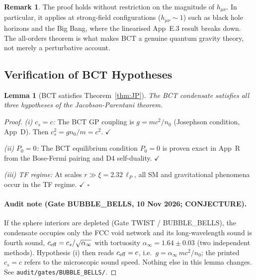 \documentclass[11pt,a4paper]{article}
\theoremstyle{bctthm}
\newtheorem{lemma}[theorem]{Lemma}
\theoremstyle{definition}
\newtheorem{remark}{Remark}
\begin{document}
\begin{remark}
The proof holds without restriction on the magnitude of $h_{\mu\nu}$.
In particular, it applies at strong-field configurations ($h_{\mu\nu}\sim 1$)
such as black hole horizons and the Big Bang, where the linearised App~E.3 result
breaks down. The all-orders theorem is what makes BCT a genuine quantum gravity
theory, not merely a perturbative account.
\end{remark}

\subsection{Verification of BCT Hypotheses}

\begin{lemma}[BCT satisfies Theorem~\ref{thm:JP}]\label{lem:hyp}
The BCT condensate satisfies all three hypotheses of the Jacobson-Parentani
theorem.
\end{lemma}
\begin{proof}
\emph{(i) $c_s = c$:} The BCT GP coupling is $g = mc^2/n_0$ (Josephson condition,
App~D). Then $c_s^2 = gn_0/m = c^2$. $\checkmark$

\emph{(ii) $P_0 = 0$:} The BCT equilibrium condition $P_0 = 0$ is proven exact
in App~R from the Bose-Fermi pairing and D4 self-duality. $\checkmark$

\emph{(iii) TF regime:} At scales $r \gg \xi = 2.32\,\ell_P$, all SM and
gravitational phenomena occur in the TF regime. $\checkmark$ $\square$

\paragraph*{Audit note (Gate BUBBLE\_BELLS, 10 Nov 2026; CONJECTURE).} If the sphere interiors are depleted (Gate TWIST / BUBBLE\_BELLS), the condensate occupies only the FCC void network and its long-wavelength sound is fourth sound, $c_{\rm eff}=c_s/\sqrt{\alpha_\infty}$ with tortuosity $\alpha_\infty=1.64\pm0.03$ (two independent methods). Hypothesis (i) then reads $c_{\rm eff}=c$, i.e.\ $g=\alpha_\infty\,mc^2/n_0$; the printed $c_s=c$ refers to the microscopic sound speed. Nothing else in this lemma changes. See \texttt{audit/gates/BUBBLE\_BELLS/}.

\end{proof}
\end{document}
